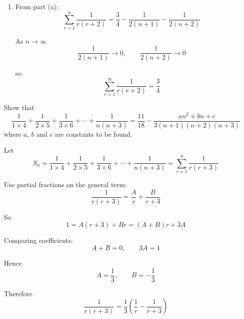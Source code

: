 \documentclass[leqno]{article}
\begin{document}
\begin{enumerate}[
  label=\textbf{\arabic*.},
  leftmargin=*,
  topsep=0pt,
  partopsep=0pt,
  parsep=0pt
]
\begin{djsSolution}
\begin{enumerate}[label=\textbf{(\alph*)}]
  Now use the method of differences:
  \begin{align*}
  S_n
  &=\frac12\Bigl(1+\frac12+\cxl{blue}{\frac13}+\cxl{red}{\frac14}+\cdots+\cxl{teal}{\frac1n}
  -\cxl{blue}{\frac13}-\cxl{red}{\frac14}-\cdots-\cxl{teal}{\frac1n}
  -\frac1{n+1}-\frac1{n+2}\Bigr)\\
  &=\frac12\left(1+\frac12-\frac1{n+1}-\frac1{n+2}\right)\\
  &=\frac12\left(\frac32-\frac1{n+1}-\frac1{n+2}\right)\\
  &=\frac34-\frac1{2(n+1)}-\frac1{2(n+2)}
  \end{align*}

  Hence
  \[
  \sum_{r=1}^{n}\frac{1}{r(r+2)}=\frac34-\frac1{2(n+1)}-\frac1{2(n+2)}
  \]

  \item From part (a):
  \[
  \sum_{r=1}^{n}\frac{1}{r(r+2)}=\frac34-\frac1{2(n+1)}-\frac1{2(n+2)}
  \]

  As \(n\to\infty\)
  \[
  \frac1{2(n+1)}\to 0,\qquad \frac1{2(n+2)}\to 0
  \]

  so
  \[
  \sum_{r=1}^{\infty}\frac{1}{r(r+2)}=\frac34
  \]
\end{enumerate}
\end{djsSolution}


\newpage

\questionitem

Show that
\[
\frac{1}{1 \times 4} + \frac{1}{2 \times 5} + \frac{1}{3 \times 6} + \cdots + \frac{1}{n(n+3)} = \frac{11}{18} - \frac{an^2+bn+c}{3(n+1)(n+2)(n+3)}
\]
where $a$, $b$ and $c$ are constants to be found.  \\

\vspace*{10pt}

\begin{djsSolution}
Let
\[
S_n=\frac{1}{1\times 4}+\frac{1}{2\times 5}+\frac{1}{3\times 6}+\cdots+\frac{1}{n(n+3)}
=\sum_{r=1}^n \frac{1}{r(r+3)}
\]

Use partial fractions on the general term:
\[
\frac{1}{r(r+3)}=\frac{A}{r}+\frac{B}{r+3}
\]

So
\[
1=A(r+3)+Br=(A+B)r+3A
\]

Comparing coefficients:
\[
A+B=0,\qquad 3A=1
\]

Hence
\[
A=\frac13,\qquad B=-\frac13
\]

Therefore
\[
\frac{1}{r(r+3)}=\frac13\left(\frac1r-\frac1{r+3}\right)
\]


\end{djsSolution}
\end{enumerate}
\end{document}
